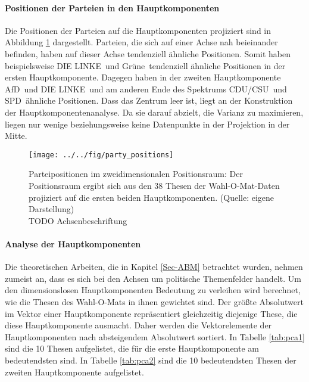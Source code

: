 \paragraph{Positionen der Parteien in den Hauptkomponenten}
Die Positionen der Parteien auf die Hauptkomponenten projiziert sind in Abbildung \ref{fig:party-positions-pca} dargestellt. Parteien, die sich auf einer Achse nah beieinander befinden, haben auf dieser Achse tendenziell ähnliche Positionen. Somit haben beispielsweise \glqq DIE LINKE\grqq\ und \glqq Grüne\grqq\ tendenziell ähnliche Positionen in der ersten Hauptkomponente. Dagegen haben in der zweiten Hauptkomponente \glqq AfD\grqq\ und \glqq DIE LINKE\grqq\ und am anderen Ende des Spektrums \glqq CDU/CSU\grqq\ und \glqq SPD\grqq\ ähnliche Positionen. Dass das Zentrum leer ist, liegt an der Konstruktion der Hauptkomponentenanalyse. Da sie darauf abzielt, die Varianz zu maximieren, liegen nur wenige beziehungsweise keine Datenpunkte in der Projektion in der Mitte.

\begin{figure}[htb]
	\centering
	\texttt{[image: ../../fig/party\_positions]}
	\caption{Parteipositionen im zweidimensionalen Positionsraum: Der Positionsraum ergibt sich aus den 38 Thesen der Wahl-O-Mat-Daten \citep{WahlOMat,Bolte2022QualOMat} projiziert auf die ersten beiden Hauptkomponenten. (Quelle: eigene Darstellung)\\TODO Achsenbeschriftung}
	\label{fig:party-positions-pca}
\end{figure}

\paragraph{Analyse der Hauptkomponenten}
Die theoretischen Arbeiten, die in Kapitel \ref{Sec-ABM} betrachtet wurden, nehmen zumeist an, dass es sich bei den Achsen um politische Themenfelder handelt.
Um den dimensionslosen Hauptkomponenten Bedeutung zu verleihen wird berechnet, wie die Thesen des Wahl-O-Mats in ihnen gewichtet sind. Der größte Absolutwert im Vektor einer Hauptkomponente repräsentiert gleichzeitig diejenige These, die diese Hauptkomponente ausmacht. Daher werden die Vektorelemente der Hauptkomponenten nach absteigendem Absolutwert sortiert.
In Tabelle \ref{tab:pca1} sind die 10 Thesen aufgelistet, die für die erste Hauptkomponente am bedeutendsten sind. In Tabelle \ref{tab:pca2} sind die 10 bedeutendsten Thesen der zweiten Hauptkomponente aufgelistet.

